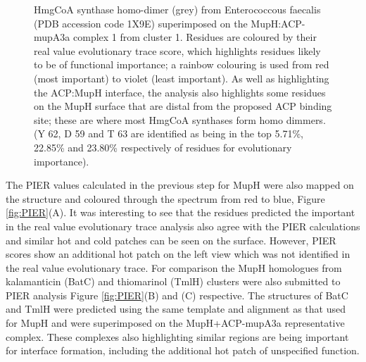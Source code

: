 			\setlength\fboxsep{5pt}
			\setlength\fboxrule{1.5pt}
			\begin{figure} [h!]
			\centering
			\caption[HmgCoA synthase homo-dimer (grey) from Enterococcous faecalis (PDB accession code 1X9E) superimposed on the MupH:ACP-mupA3a complex 1 from cluster 1.]{HmgCoA synthase homo-dimer (grey) from Enterococcous faecalis (PDB accession code 1X9E) superimposed on the MupH:ACP-mupA3a complex 1 from cluster 1. Residues are coloured by their real value evolutionary trace score, which highlights residues likely to be of functional importance; a rainbow colouring is used from red (most important) to violet (least important). As well as highlighting the ACP:MupH interface, the analysis also highlights some residues on the MupH surface that are distal from the proposed ACP binding site; these are where most HmgCoA synthases form homo dimmers. (Y 62, D 59 and T 63 are identified as being in the top 5.71\%, 22.85\% and 23.80\% respectively of residues for evolutionary importance).}
			\label{fig:etcomplex}
			\end{figure}					
		
		The PIER values calculated in the previous step for MupH were also mapped on the structure and coloured through the spectrum from red to blue, Figure \ref{fig:PIER}(A). It was interesting to see that the residues predicted the important in the real value evolutionary trace analysis also agree with the PIER calculations and similar hot and cold patches can be seen on the surface. However, PIER scores show an additional hot patch on the left view which was not identified in the real value evolutionary trace. For comparison the MupH homologues from kalamanticin (BatC) and thiomarinol (TmlH) clusters were also submitted to PIER analysis Figure \ref{fig:PIER}(B) and (C) respective. The structures of BatC and TmlH were predicted using the same template and alignment as that used for MupH and were superimposed on the MupH+ACP-mupA3a representative complex. These complexes also highlighting similar regions are being important for interface formation, including the additional hot patch of unspecified function. 

